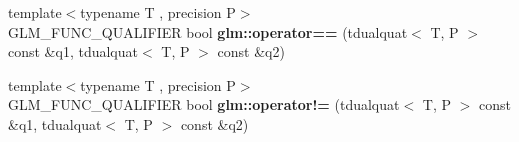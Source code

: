 \begin{DoxyCompactItemize}
\item 
\hypertarget{namespaceglm_aad95e2ae87bce8bf591ce20fc6997f49}{{\footnotesize template$<$typename T , precision P$>$ }\\G\-L\-M\-\_\-\-F\-U\-N\-C\-\_\-\-Q\-U\-A\-L\-I\-F\-I\-E\-R bool {\bfseries glm\-::operator==} (tdualquat$<$ T, P $>$ const \&q1, tdualquat$<$ T, P $>$ const \&q2)}\label{namespaceglm_aad95e2ae87bce8bf591ce20fc6997f49}

\item 
\hypertarget{namespaceglm_a7720bbb7f60c8f0780ddd38e2f651331}{{\footnotesize template$<$typename T , precision P$>$ }\\G\-L\-M\-\_\-\-F\-U\-N\-C\-\_\-\-Q\-U\-A\-L\-I\-F\-I\-E\-R bool {\bfseries glm\-::operator!=} (tdualquat$<$ T, P $>$ const \&q1, tdualquat$<$ T, P $>$ const \&q2)}\label{namespaceglm_a7720bbb7f60c8f0780ddd38e2f651331}


\end{DoxyCompactItemize}
